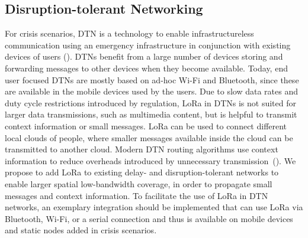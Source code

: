 \subsection{Disruption-tolerant Networking}
For crisis scenarios, DTN is a technology to enable infrastructureless communication using an emergency infrastructure in conjunction with existing devices of users (\cite{baumgartner2016experimental,lieser2017architecture}). 
DTNs benefit from a large number of devices storing and forwarding messages to other devices when they become available. 
Today, end user focused DTNs are mostly based on ad-hoc Wi-Fi and Bluetooth, since these are available in the mobile devices used by the users. 
Due to slow data rates and duty cycle restrictions introduced by regulation, LoRa in DTNs is not suited for larger data transmissions, such as multimedia content, but is helpful to transmit context information or small messages.
LoRa can be used to connect different local clouds of people, where smaller messages available inside the cloud can be transmitted to another cloud. 
Modern DTN routing algorithms use context information to reduce overheads introduced by unnecessary transmission~(\cite{graubner2018opportunistic}). 
We propose to add LoRa to existing delay- and disruption-tolerant networks to enable larger spatial low-bandwidth coverage, in order to propagate small messages and context information. 
To facilitate the use of LoRa in DTN networks, an exemplary integration should be implemented that can use LoRa via Bluetooth, Wi-Fi, or a serial connection and thus is available on mobile devices and static nodes added in crisis scenarios.
